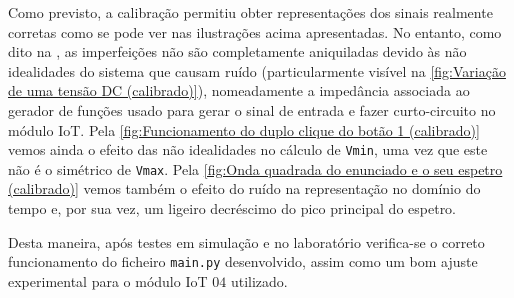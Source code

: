 Como previsto, a calibração permitiu obter representações dos sinais realmente corretas como se pode ver nas ilustrações acima apresentadas. No entanto, como dito na , as imperfeições não são completamente aniquiladas devido às não idealidades do sistema que causam ruído (particularmente visível na \autoref{fig:Variação de uma tensão DC (calibrado)}), nomeadamente a impedância associada ao gerador de funções usado para gerar o sinal de entrada e fazer curto-circuito no módulo IoT. Pela \autoref{fig:Funcionamento do duplo clique do botão 1 (calibrado)} vemos ainda o efeito das não idealidades no cálculo de \texttt{Vmin}, uma vez que este não é o simétrico de \texttt{Vmax}. Pela \autoref{fig:Onda quadrada do enunciado e o seu espetro (calibrado)} vemos também o efeito do ruído na representação no domínio do tempo e, por sua vez, um ligeiro decréscimo do pico principal do espetro.

Desta maneira, após testes em simulação e no laboratório verifica-se o correto funcionamento do ficheiro \texttt{main.py} desenvolvido, assim como um bom ajuste experimental para o módulo IoT $04$ utilizado.
